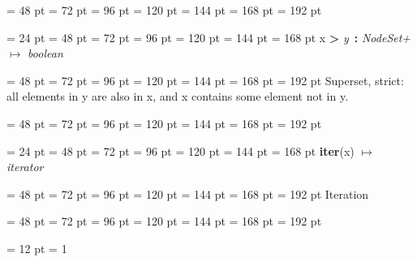 {{{{\par}
{\par \noindent  \leftskip = 48 pt  \leftmargini = 72 pt  \leftmarginii = 96 pt  \leftmarginiii = 120 pt  \leftmarginiv = 144 pt  \leftmarginv = 168 pt  \leftmarginvi = 192 pt {\par \noindent
\par}
\par}
\par}
\par}
{\par \noindent  \leftskip = 24 pt  \leftmargini = 48 pt  \leftmarginii = 72 pt  \leftmarginiii = 96 pt  \leftmarginiv = 120 pt  \leftmarginv = 144 pt  \leftmarginvi = 168 pt x {\large {\bf {\textgreater}\/}} {\em y\/}~{\bf :}  {\em NodeSet+\/} \(\mapsto \)  {\em boolean\/}{\par \noindent
{\par \noindent  \leftskip = 48 pt  \leftmargini = 72 pt  \leftmarginii = 96 pt  \leftmarginiii = 120 pt  \leftmarginiv = 144 pt  \leftmarginv = 168 pt  \leftmarginvi = 192 pt 
Superset, strict:
             all elements in y are also in x,
             and x contains some element not in y.
\par}
{\par \noindent  \leftskip = 48 pt  \leftmargini = 72 pt  \leftmarginii = 96 pt  \leftmarginiii = 120 pt  \leftmarginiv = 144 pt  \leftmarginv = 168 pt  \leftmarginvi = 192 pt {\par \noindent
\par}
\par}
\par}
\par}
{\par \noindent  \leftskip = 24 pt  \leftmargini = 48 pt  \leftmarginii = 72 pt  \leftmarginiii = 96 pt  \leftmarginiv = 120 pt  \leftmarginv = 144 pt  \leftmarginvi = 168 pt {\large {\bf iter\/}}(x) \(\mapsto \)  {\em iterator\/}{\par \noindent
{\par \noindent  \leftskip = 48 pt  \leftmargini = 72 pt  \leftmarginii = 96 pt  \leftmarginiii = 120 pt  \leftmarginiv = 144 pt  \leftmarginv = 168 pt  \leftmarginvi = 192 pt  Iteration\par}
{\par \noindent  \leftskip = 48 pt  \leftmargini = 72 pt  \leftmarginii = 96 pt  \leftmarginiii = 120 pt  \leftmarginiv = 144 pt  \leftmarginv = 168 pt  \leftmarginvi = 192 pt {\par \noindent
{\par \pagebreak[3.100000] \noindent \hangindent = 12 pt \hangafter = 1 
}}}}}}
